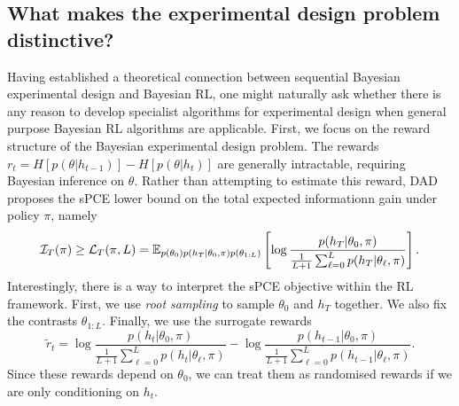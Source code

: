 \documentclass[a4paper, 10pt]{report}
\theoremstyle{plain}
\begin{document}
	
	\subsection{What makes the experimental design problem distinctive?}
	Having established a theoretical connection between sequential Bayesian experimental design and Bayesian RL, one might naturally ask whether there is any reason to develop specialist algorithms for experimental design when general purpose Bayesian RL algorithms are applicable.
	First, we focus on the reward structure of the Bayesian experimental design problem.
	The rewards $r_t = H[p(\theta|h_{t-1})] - H[p(\theta|h_t)]$ are generally intractable, requiring Bayesian inference on $\theta$.
	Rather than attempting to estimate this reward, DAD proposes the sPCE lower bound on the total expected informationn gain under policy $\pi$, namely
	\begin{equation}
	\mathcal{I}_T(\pi) \ge \mathcal{L}_T(\pi,L) = \mathbb{E}_{p(\theta_0)p(h_T|\theta_0,\pi)p(\theta_{1:L})}\left[ \log \frac{p(h_T|\theta_0,\pi)}{\frac{1}{L+1}\sum_{\ell=0}^L p(h_T|\theta_\ell,\pi) } \right].
	\end{equation}
	Interestingly, there is a way to interpret the sPCE objective within the RL framework.
	First, we use \emph{root sampling} to sample $\theta_0$ and $h_T$ together.
	We also fix the contrasts $\theta_{1:L}$.
	Finally, we use the surrogate rewards
	\begin{equation}
	\tilde{r}_t = \log\frac{p(h_t|\theta_0,\pi)}{\frac{1}{L+1}\sum_{\ell=0}^L p(h_t|\theta_\ell,\pi)} - \log\frac{p(h_{t-1}|\theta_0,\pi)}{\frac{1}{L+1}\sum_{\ell=0}^L p(h_{t-1}|\theta_\ell,\pi)}.
	\end{equation}
	Since these rewards depend on $\theta_0$, we can treat them as randomised rewards if we are only conditioning on $h_t$.
	
\end{document}
